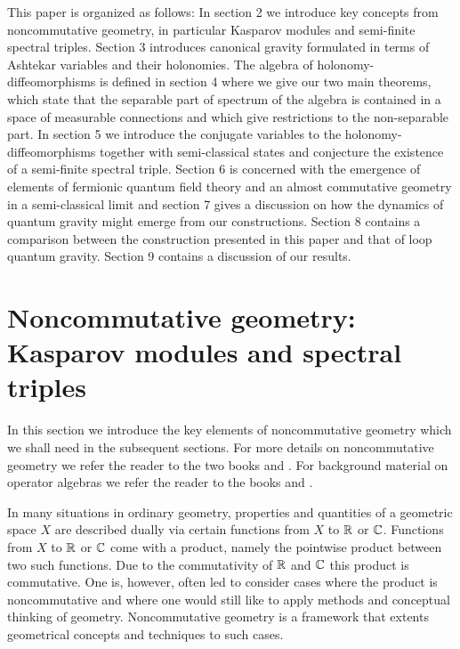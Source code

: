 \documentclass[12pt]{article}
\newcommand{\bbC}{{\Bbb C}}
\newcommand{\bbR}{{\Bbb R}}
\begin{document}
This paper is organized as follows: In section 2 we introduce key concepts from noncommutative geometry, in particular Kasparov modules and semi-finite spectral triples. Section 3 introduces canonical gravity formulated in terms of Ashtekar variables and their holonomies. The algebra of holonomy-diffeomorphisms is defined in section 4 where we give our two main theorems, which state that the separable part of spectrum of the algebra is contained in a space of measurable connections and which give restrictions to the non-separable part. In section 5 we introduce the conjugate variables to the holonomy-diffeomorphisms together with semi-classical states and conjecture the existence of a semi-finite spectral triple. Section 6 is concerned with the emergence of elements of fermionic quantum field theory and an almost commutative geometry in a semi-classical limit and section 7 gives a discussion on how the dynamics of quantum gravity might emerge from our constructions. Section 8 contains a comparison between the construction presented in this paper and that of loop quantum gravity. Section 9 contains a discussion of our results.
















\section{Noncommutative geometry: Kasparov modules and spectral triples}
 \label{noncommutativesection}
In this section we introduce the key elements of noncommutative geometry which we shall need in the subsequent sections. For more details on noncommutative geometry we refer the reader to the two books \cite{ConnesBook} and \cite{ConnesMarcolliBook}. For background material on operator algebras we refer the reader to the books \cite{KR1,KR2} and \cite{Bratteli:1979tw,Bratteli:1996xq}.



In many situations in ordinary geometry, properties and quantities of a geometric space $X$ are  described dually via certain functions from $X$ to $\bbR$ or $\bbC$. Functions from $X$ to $\bbR$ or $\bbC$ come with a product, namely the pointwise product between two such functions. Due to the commutativity of $\bbR$ and $\bbC$ this product is commutative.        
One is, however, often led to consider cases where the product is noncommutative and where one would still like to apply methods and conceptual thinking of geometry. 
Noncommutative geometry is a framework that extents geometrical concepts and techniques to such cases.
\end{document}

